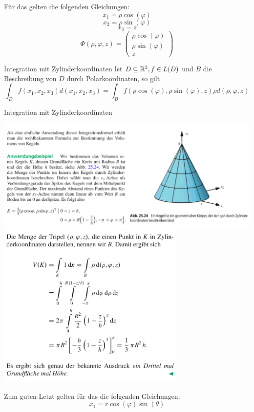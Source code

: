 Für das  gelten die folgenden Gleichungen:
$$x_1=\rho\cos(\varphi)$$
$$x_2=\rho \sin(\varphi)$$
$$x_3=z$$
$$\Phi(\rho, \varphi, z)=\begin{pmatrix}
    \rho \cos(\varphi) \\
    \rho \sin(\varphi) \\
    z
\end{pmatrix}$$
\begin{Def}{Integration mit Zylinderkoordinaten}
Ist $D\subseteq \mathbb{R}^3, f\in L(D)$ und $B$ die Beschreibung von $D$ durch Polarkoordinaten, so gilt
$$\int_D f(x_1,x_2,x_3)d(x_1,x_2,x_3) = \int_B f(\rho\cos(\varphi), \rho\sin(\varphi),z)\rho d(\rho, \varphi, z)$$
\end{Def}
\begin{Beispiel}{Integration mit Zylinderkoordinaten}
    \begin{center}
    \includegraphics[width=1.0\textwidth]{Dateien/Zylinderkoord1.png}
    \includegraphics[width=0.7\textwidth]{Dateien/Zylinderkoord2.png}
\end{center}
\end{Beispiel}
Zum guten Letzt gelten für das  die folgenden Gleichungen:
$$x_1=r\cos(\varphi)\sin(\theta)$$

